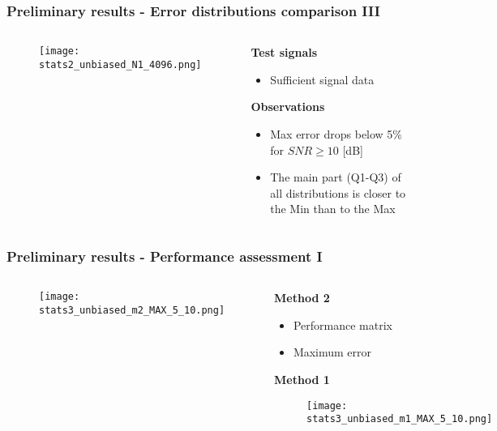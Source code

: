 \documentclass[11pt,aspectratio=169]{beamer}
\begin{document}
	\begin{frame}
		\frametitle{Preliminary results - Error distributions comparison III}
		\begin{columns}[t]
			\begin{RIPcolleft}
				\begin{figure}
					\texttt{[image: stats2\_unbiased\_N1\_4096.png]}
				\end{figure}
			\end{RIPcolleft}
			\begin{RIPcolright}
				\textbf{Test signals}\\
				\begin{itemize}
					\item Sufficient signal data
				\end{itemize}
				\textbf{Observations}\\
				\begin{itemize}
					\item Max error drops below 5\% for $SNR \ge 10$ [dB]
					\item The main part (Q1-Q3) of all distributions is closer to the Min than to the Max
				\end{itemize}
			\end{RIPcolright}
		\end{columns}
	\end{frame}
	\begin{frame}
		\frametitle{Preliminary results - Performance assessment I}
		\begin{columns}[t]
			\begin{RIPcolleft}
				\begin{figure}
					\texttt{[image: stats3\_unbiased\_m2\_MAX\_5\_10.png]}
				\end{figure}
			\end{RIPcolleft}
			\begin{RIPcolright}
				\textbf{Method 2}\\
				\begin{itemize}
					\item Performance matrix
					\item Maximum error
				\end{itemize}
				\vspace{.5em}
				\textbf{Method 1}\\
				\begin{figure}
					\texttt{[image: stats3\_unbiased\_m1\_MAX\_5\_10.png]}
				\end{figure}
			\end{RIPcolright}
		\end{columns}
	\end{frame}
\end{document}

